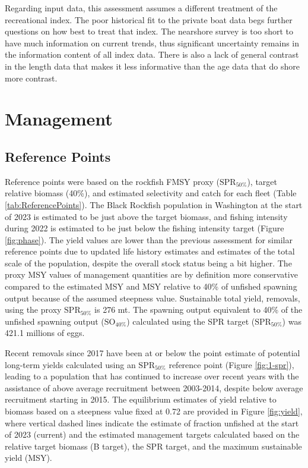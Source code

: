 \documentclass[11pt,
  english,
  letterpaper,
]{article}
\begin{document}
Regarding input data, this assessment assumes a different treatment of the recreational index. The poor historical fit to the private boat data begs further questions on how best to treat that index. The nearshore survey is too short to have much information on current trends, thus significant uncertainty remains in the information content of all index data. There is also a lack of general contrast in the length data that makes it less informative than the age data that do shore more contrast.

\hypertarget{management}{%
\section{Management}\label{management}}

\hypertarget{reference-points-1}{%
\subsection{Reference Points}\label{reference-points-1}}

Reference points were based on the rockfish FMSY proxy (\(\text{SPR}_{50\%}\)), target relative biomass (40\%), and estimated selectivity and catch for each fleet (Table \ref{tab:ReferencePoints}). The Black Rockfish population in Washington at the start of 2023 is estimated to be just above the target biomass, and fishing intensity during 2022 is estimated to be just below the fishing intensity target (Figure \ref{fig:phase}). The yield values are lower than the previous assessment for similar reference points due to updated life history estimates and estimates of the total scale of the population, despite the overall stock status being a bit higher. The proxy MSY values of management quantities are by definition more conservative compared to the estimated MSY and MSY relative to 40\% of unfished spawning output because of the assumed steepness value. Sustainable total yield, removals, using the proxy \(\text{SPR}_{50\%}\) is 276 mt. The spawning output equivalent to 40\% of the unfished spawning output (\(\text{SO}_{40\%}\)) calculated using the SPR target (\(\text{SPR}_{50\%}\)) was 421.1 millions of eggs.

Recent removals since 2017 have been at or below the point estimate of potential long-term yields calculated using an \(\text{SPR}_{50\%}\) reference point (Figure \ref{fig:1-spr}), leading to a population that has continued to increase over recent years with the assistance of above average recruitment between 2003-2014, despite below average recruitment starting in 2015. The equilibrium estimates of yield relative to biomass based on a steepness value fixed at 0.72 are provided in Figure \ref{fig:yield}, where vertical dashed lines indicate the estimate of fraction unfished at the start of 2023 (current) and the estimated management targets calculated based on the relative target biomass (B target), the SPR target, and the maximum sustainable yield (MSY).
\end{document}
